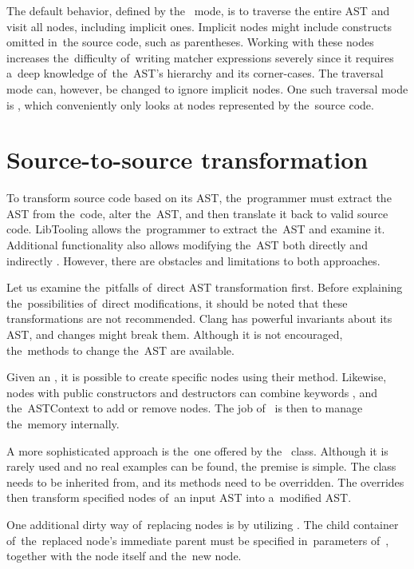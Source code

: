 The default behavior, defined by the~ mode, is to traverse 
the entire AST and visit all nodes, including implicit ones. 
Implicit nodes might include constructs omitted in~the source code, 
such as parentheses. 
Working with these nodes increases the~difficulty of~writing matcher 
expressions severely since it requires a~deep knowledge of~the~AST's 
hierarchy and its corner-cases. 
The traversal mode can, however, be changed to ignore implicit nodes. 
One such traversal mode is , 
which conveniently only looks at nodes represented by the~source code. 

\section{Source-to-source transformation}

To transform source code based on its AST, the~programmer must extract 
the AST from the~code, alter the~AST, and then translate it back to valid 
source code. 
LibTooling allows the~programmer to extract the~AST and examine it. 
Additional functionality also allows modifying the~AST both directly 
and indirectly \citep{sourcetosource:online}. 
However, there are obstacles and limitations to both approaches. 

Let us examine the~pitfalls of~direct AST transformation first. 
Before explaining the~possibilities of~direct modifications, it 
should be noted that these transformations are not recommended. 
Clang has powerful invariants about its AST, and changes might 
break them. 
Although it is not encouraged, the~methods to change the~AST 
are available.

Given an , it is possible to create specific nodes
using their  method. 
Likewise, nodes with public constructors and destructors can combine 
keywords ,  and the~ASTContext 
to add or remove nodes. 
The job of~ is then to manage the~memory internally.

A more sophisticated approach is the~one offered 
by the~ class. 
Although it is rarely used and no real examples can be found, 
the premise is simple. 
The  class needs to be inherited from, 
and its  methods need to be overridden. 
The overrides then transform specified nodes of~an input AST 
into a~modified AST.

One additional dirty way of~replacing nodes is by utilizing 
. 
The child container of~the~replaced node's immediate parent must be 
specified in~parameters of~, together with 
the node itself and the~new node.

